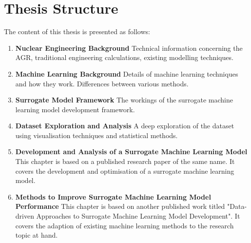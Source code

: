 \section{Thesis Structure}

The content of this thesis is presented as follows:

\begin{enumerate} 
	
	\item \textbf{Nuclear Engineering Background} Technical information concerning the AGR, traditional engineering calculations, existing modelling techniques. 
	
	\item \textbf{Machine Learning Background} Details of machine learning techniques and how they work. Differences between various methods.
	
	\item \textbf{Surrogate Model Framework} The workings of the surrogate machine learning model development framework.
	
	\item \textbf{Dataset Exploration and Analysis} A deep exploration of the dataset using visualisation techniques and statistical methods.
	
	\item \textbf{Development and Analysis of a Surrogate Machine Learning Model} This chapter is based on a published research paper of the same name. It covers the development and optimisation of a surrogate machine learning model. 
	
	\item \textbf{Methods to Improve Surrogate Machine Learning Model Performance} This chapter is based on another published work titled "Data-driven Approaches to Surrogate Machine Learning Model Development". It covers the adaption of existing machine learning methods to the research topic at hand.
		
\end{enumerate}
	
	


